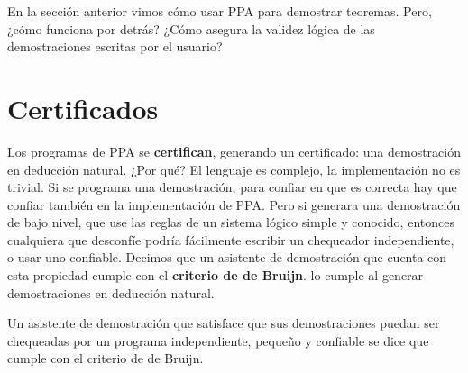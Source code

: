 
En la sección anterior vimos cómo usar PPA para demostrar teoremas. Pero, ¿cómo
funciona por detrás? ¿Cómo asegura la validez lógica de las demostraciones
escritas por el usuario?

\section{Certificados}

Los programas de PPA se \textbf{certifican}, generando un certificado: una
demostración en deducción natural. ¿Por qué? El lenguaje es complejo, la
implementación no es trivial. Si se programa una demostración, para confiar en
que es correcta hay que confiar también en la implementación de PPA. Pero si
generara una demostración de bajo nivel, que use las reglas de un sistema lógico
simple y conocido, entonces cualquiera que desconfíe podría fácilmente escribir
un chequeador independiente, o usar uno confiable. Decimos que un asistente de
demostración que cuenta con esta propiedad cumple con el
\textbf{criterio de de Bruijn}. \ppaTool{} lo cumple al generar demostraciones
en deducción natural.

\begin{prop*} Un asistente de
    demostración que satisface que sus demostraciones puedan ser chequeadas por
    un programa independiente, pequeño y confiable se dice que cumple con el
    criterio de de Bruijn.
\end{prop*}

